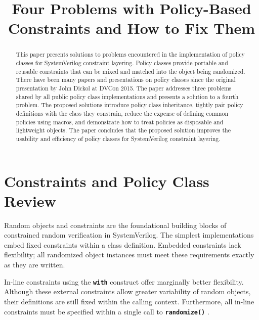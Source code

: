 \documentclass[conference,onecolumn]{IEEEtran}
\newcommand{\code}[1]{
\textbf{\texttt{#1}}
}
\begin{document}
\title{Four Problems with Policy-Based Constraints and How to Fix Them}

\author{
    \and
}

\maketitle

\thispagestyle{plain}
\pagestyle{plain}

\begin{abstract}
    This paper presents solutions to problems encountered in the implementation of policy classes for SystemVerilog constraint layering. Policy classes provide portable and reusable constraints that can be mixed and matched into the object being randomized. There have been many papers and presentations on policy classes since the original presentation by John Dickol at DVCon 2015. The paper addresses three problems shared by all public policy class implementations and presents a solution to a fourth problem. The proposed solutions introduce policy class inheritance, tightly pair policy definitions with the class they constrain, reduce the expense of defining common policies using macros, and demonstrate how to treat policies as disposable and lightweight objects. The paper concludes that the proposed solution improves the usability and efficiency of policy classes for SystemVerilog constraint layering.
\end{abstract}

\section{Constraints and Policy Class Review}

Random objects and constraints are the foundational building blocks of constrained random verification in SystemVerilog. The simplest implementations embed fixed constraints within a class definition.  Embedded constraints lack flexibility; all randomized object instances must meet these requirements exactly as they are written.

In-line constraints using the \code{with} construct offer marginally better flexibility.  Although these external constraints allow greater variability of random objects, their definitions are still fixed within the calling context.  Furthermore, all in-line constraints must be specified within a single call to \code{randomize()}.
\end{document}
